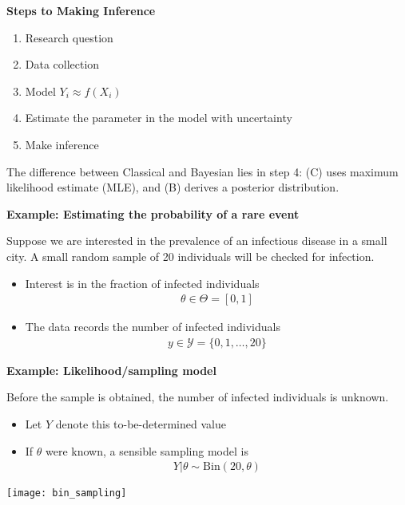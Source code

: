 \documentclass[12pt,xcolor=svgnames]{beamer}
\newcommand{\bl}{\color{blue}}
\newcommand{\theme}{\color{FireBrick}}
\newcommand{\mr}[1]{\mathrm{#1}}
\newcommand{\sk}{\vspace{.4cm}}
\newcommand{\chap}[1]{{\theme \Large \bf #1} \sk}
\begin{document}
\begin{frame}
\chap{Steps to Making Inference} 


\begin{enumerate}
\item Research question
\item Data collection
\item Model $Y_i \approx f(X_i)$ 
\item Estimate the parameter in the model with uncertainty
\item Make inference
\end{enumerate}

The difference between {\bl Classical} and {\bl Bayesian} lies in step 4: (C) uses maximum likelihood estimate (MLE), and (B) derives a posterior distribution.
\end{frame}


\begin{frame}
\chap{Example: Estimating the probability of a rare event}

Suppose we are interested in the prevalence of an infectious disease in a small city.  A small random sample of 20 individuals will be checked for infection.
\begin{itemize}
\item Interest is in the fraction of infected individuals
\begin{align*}
\theta \in \Theta =[0,1]
\end{align*}
\item The data records the number of infected individuals
\begin{align*}
y \in \mathcal{Y} =\{0,1, \ldots, 20\}
\end{align*}
\end{itemize}

\end{frame}

\begin{frame}
\chap{Example: Likelihood/sampling model}

Before the sample is obtained, the number of infected individuals is unknown. 
\begin{itemize}
\item Let $Y$ denote this to-be-determined value
\item If $\theta$ were known, a sensible {\bl sampling} model is
\begin{align*}
Y|\theta \sim \mr{Bin} (20, \theta)
\end{align*}
\end{itemize}
\begin{center}
\texttt{[image: bin\_sampling]}
\end{center}

\end{frame}
\end{document}

